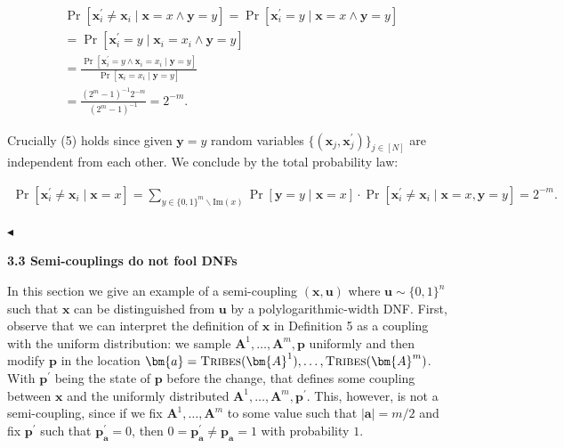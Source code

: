 \documentclass[10pt,a4paper]{article}
\begin{document}
\[\begin{gathered}
\displaystyle\Pr[\bm{x}^{\prime}_{i}\neq\bm{x}_{i}\mid\bm{x}=x\land\bm{y}=y] \displaystyle=\Pr[\bm{x}^{\prime}_{i}=y\mid\bm{x}=x\land\bm{y}=y] \\
\displaystyle=\Pr[\bm{x}^{\prime}_{i}=y\mid\bm{x}_{i}=x_{i}\land\bm{y}=y] \\
\displaystyle=\frac{\Pr[\bm{x}^{\prime}_{i}=y\land\bm{x}_{i}=x_{i}\mid\bm{y}=y]}{\Pr[\bm{x}_{i}=x_{i}\mid\bm{y}=y]} \\
\displaystyle=\frac{(2^{m}-1)^{-1}2^{-m}}{(2^{m}-1)^{-1}}=2^{-m}.
\end{gathered}\]


Crucially (5) holds since given $\bm{y}=y$ random variables $\{(\bm{x}_{j},\bm{x}^{\prime}_{j})\}_{j\in[N]}$ are independent from each other. We conclude by the total probability law:\par


\[\begin{gathered}
\Pr[\bm{x}^{\prime}_{i}\neq\bm{x}_{i}\mid\bm{x}=x]=\sum_{y\in\{0,1\}^{m}\smallsetminus\mathrm{Im}(x)}\Pr[\bm{y}=y\mid\bm{x}=x]\cdot\Pr[\bm{x}^{\prime}_{i}\neq\bm{x}_{i}\mid\bm{x}=x,\bm{y}=y]=2^{-m}.\
\end{gathered}\]


$\blacktriangleleft$\par






\par\medskip\noindent\textbf{
3.3 Semi-couplings do not fool DNFs}\par




In this section we give an example of a semi-coupling $(\bm{x},\bm{u})$ where $\bm{u}\sim\{0,1\}^{n}$ such that $\bm{x}$ can be distinguished from $\bm{u}$ by a polylogarithmic-width DNF. First, observe that we can interpret the definition of $\bm{x}$ in Definition 5 as a coupling with the uniform distribution: we sample $\bm{A}^{1},\dots,\bm{A}^{m},\bm{p}$ uniformly and then modify $\bm{p}$ in the location $\bm{a}=\textsc{Tribes}(\bm{A}^{1}),\dots,\textsc{Tribes}(\bm{A}^{m})$. With $\bm{p}^{\prime}$ being the state of $\bm{p}$ before the change, that defines some coupling between $\bm{x}$ and the uniformly distributed $\bm{A}^{1},\dots,\bm{A}^{m},\bm{p}^{\prime}$. This, however, is not a semi-coupling, since if we fix $\bm{A}^{1},\dots,\bm{A}^{m}$ to some value such that $|\bm{a}|=m/2$ and fix $\bm{p}^{\prime}$ such that $\bm{p}^{\prime}_{\bm{a}}=0$, then $0=\bm{p}^{\prime}_{\bm{a}}\neq\bm{p}_{\bm{a}}=1$ with probability $1$.\par
\end{document}
